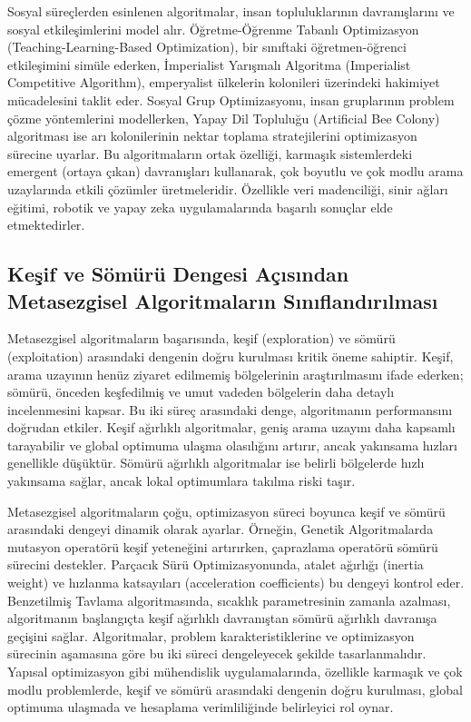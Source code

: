 Sosyal süreçlerden esinlenen algoritmalar, insan topluluklarının davranışlarını ve sosyal etkileşimlerini model alır. Öğretme-Öğrenme Tabanlı Optimizasyon (Teaching-Learning-Based Optimization), bir sınıftaki öğretmen-öğrenci etkileşimini simüle ederken, İmperialist Yarışmalı Algoritma (Imperialist Competitive Algorithm), emperyalist ülkelerin kolonileri üzerindeki hakimiyet mücadelesini taklit eder. Sosyal Grup Optimizasyonu, insan gruplarının problem çözme yöntemlerini modellerken, Yapay Dil Topluluğu (Artificial Bee Colony) algoritması ise arı kolonilerinin nektar toplama stratejilerini optimizasyon sürecine uyarlar. Bu algoritmaların ortak özelliği, karmaşık sistemlerdeki emergent (ortaya çıkan) davranışları kullanarak, çok boyutlu ve çok modlu arama uzaylarında etkili çözümler üretmeleridir. Özellikle veri madenciliği, sinir ağları eğitimi, robotik ve yapay zeka uygulamalarında başarılı sonuçlar elde etmektedirler.

\subsection{Keşif ve Sömürü Dengesi Açısından Metasezgisel Algoritmaların Sınıflandırılması}

Metasezgisel algoritmaların başarısında, keşif (exploration) ve sömürü (exploitation) arasındaki dengenin doğru kurulması kritik öneme sahiptir. Keşif, arama uzayının henüz ziyaret edilmemiş bölgelerinin araştırılmasını ifade ederken; sömürü, önceden keşfedilmiş ve umut vadeden bölgelerin daha detaylı incelenmesini kapsar. Bu iki süreç arasındaki denge, algoritmanın performansını doğrudan etkiler. Keşif ağırlıklı algoritmalar, geniş arama uzayını daha kapsamlı tarayabilir ve global optimuma ulaşma olasılığını artırır, ancak yakınsama hızları genellikle düşüktür. Sömürü ağırlıklı algoritmalar ise belirli bölgelerde hızlı yakınsama sağlar, ancak lokal optimumlara takılma riski taşır.

Metasezgisel algoritmaların çoğu, optimizasyon süreci boyunca keşif ve sömürü arasındaki dengeyi dinamik olarak ayarlar. Örneğin, Genetik Algoritmalarda mutasyon operatörü keşif yeteneğini artırırken, çaprazlama operatörü sömürü sürecini destekler. Parçacık Sürü Optimizasyonunda, atalet ağırlığı (inertia weight) ve hızlanma katsayıları (acceleration coefficients) bu dengeyi kontrol eder. Benzetilmiş Tavlama algoritmasında, sıcaklık parametresinin zamanla azalması, algoritmanın başlangıçta keşif ağırlıklı davranıştan sömürü ağırlıklı davranışa geçişini sağlar. Algoritmalar, problem karakteristiklerine ve optimizasyon sürecinin aşamasına göre bu iki süreci dengeleyecek şekilde tasarlanmalıdır. Yapısal optimizasyon gibi mühendislik uygulamalarında, özellikle karmaşık ve çok modlu problemlerde, keşif ve sömürü arasındaki dengenin doğru kurulması, global optimuma ulaşmada ve hesaplama verimliliğinde belirleyici rol oynar.

